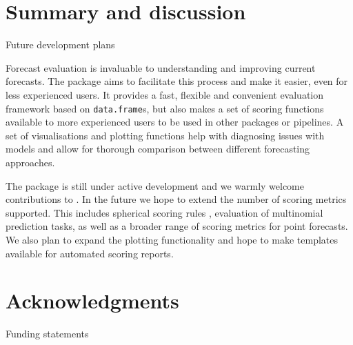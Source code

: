 \documentclass[
]{jss}
\begin{document}
\section{Summary and discussion}\label{summary-and-discussion}

Future development plans

Forecast evaluation is invaluable to understanding and improving current
forecasts. The  package aims to facilitate this
process and make it easier, even for less experienced users. It provides
a fast, flexible and convenient evaluation framework based on
\texttt{data.frame}s, but also makes a set of scoring functions
available to more experienced users to be used in other packages or
pipelines. A set of visualisations and plotting functions help with
diagnosing issues with models and allow for thorough comparison between
different forecasting approaches.

The package is still under active development and we warmly welcome
contributions to . In the future we hope to extend the
number of scoring metrics supported. This includes spherical scoring
rules
\citep{gneitingStrictlyProperScoring2007, joseCharacterizationSphericalScoring2009, macheteContrastingProbabilisticScoring2012},
evaluation of multinomial prediction tasks, as well as a broader range
of scoring metrics for point forecasts. We also plan to expand the
plotting functionality and hope to make templates available for
automated scoring reports.

\section{Acknowledgments}\label{acknowledgments}

Funding statements
\end{document}
